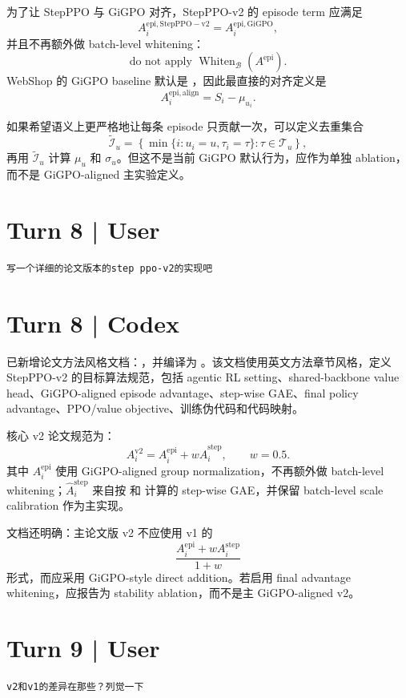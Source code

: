 \documentclass[10pt]{ctexart}
\begin{document}
为了让 StepPPO 与 GiGPO 对齐，StepPPO-v2 的 episode term 应满足
\[
A_i^{\mathrm{epi,StepPPO-v2}}=A_i^{\mathrm{epi,GiGPO}},
\]
并且不再额外做 batch-level whitening：
\[
\text{do not apply }\operatorname{Whiten}_{\mathcal B}(A^{\mathrm{epi}}).
\]
WebShop 的 GiGPO baseline 默认是 ，因此最直接的对齐定义是
\[
A_i^{\mathrm{epi,align}}=S_i-\mu_{u_i}.
\]

如果希望语义上更严格地让每条 episode 只贡献一次，可以定义去重集合
\[
\widetilde{\mathcal I}_u
=
\left\{\min\{i:u_i=u,\tau_i=\tau\}:\tau\in\mathcal T_u\right\},
\]
再用 $\widetilde{\mathcal I}_u$ 计算 $\mu_u$ 和 $\sigma_u$。但这不是当前 GiGPO 默认行为，应作为单独 ablation，而不是 GiGPO-aligned 主实验定义。

\section*{Turn 8 | User}
\begin{Verbatim}[breaklines=true,breakanywhere=true]
写一个详细的论文版本的step ppo-v2的实现吧
\end{Verbatim}

\section*{Turn 8 | Codex}
已新增论文方法风格文档：，并编译为 。该文档使用英文方法章节风格，定义 StepPPO-v2 的目标算法规范，包括 agentic RL setting、shared-backbone value head、GiGPO-aligned episode advantage、step-wise GAE、final policy advantage、PPO/value objective、训练伪代码和代码映射。

核心 v2 论文规范为：
\[
A_i^{\mathrm{v2}}
=
A_i^{\mathrm{epi}}+w\widehat A_i^{\mathrm{step}},
\qquad
w=0.5.
\]
其中 $A_i^{\mathrm{epi}}$ 使用 GiGPO-aligned  group normalization，不再额外做 batch-level whitening；$\widehat A_i^{\mathrm{step}}$ 来自按  和  计算的 step-wise GAE，并保留 batch-level scale calibration 作为主实现。

文档还明确：主论文版 v2 不应使用 v1 的
\[
\frac{A_i^{\mathrm{epi}}+wA_i^{\mathrm{step}}}{1+w}
\]
形式，而应采用 GiGPO-style direct addition。若启用 final advantage whitening，应报告为 stability ablation，而不是主 GiGPO-aligned v2。

\section*{Turn 9 | User}
\begin{Verbatim}[breaklines=true,breakanywhere=true]
v2和v1的差异在那些？列觉一下
\end{Verbatim}
\end{document}
